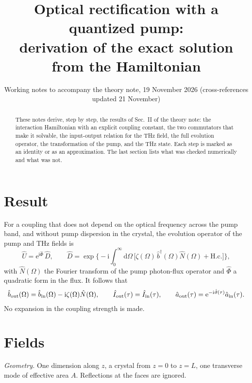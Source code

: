 \documentclass[aps,pra,onecolumn,notitlepage,11pt,amsmath,amssymb,nofootinbib]{revtex4-2}
\newcommand{\Nop}{\hat N}
\newcommand{\Iop}{\hat I}
\newcommand{\dd}{\mathrm{d}}
\newcommand{\ee}{\mathrm{e}}
\newcommand{\ii}{\mathrm{i}}
\begin{document}
\title{Optical rectification with a quantized pump:\\
derivation of the exact solution from the Hamiltonian}
\author{Working notes to accompany the theory note, 19 November 2026
(cross-references updated 21 November)}
\noaffiliation

\begin{abstract}
These notes derive, step by step, the results of Sec.~II of the theory note:
the interaction Hamiltonian with an explicit coupling constant, the two
commutators that make it solvable, the input-output relation for the THz
field, the full evolution operator, the transformation of the pump, and the
THz state. Each step is marked as an identity or as an approximation. The
last section lists what was checked numerically and what was not.
\end{abstract}

\maketitle

\section{Result}

For a coupling that does not depend on the optical frequency across the pump
band, and without pump dispersion in the crystal, the evolution operator of
the pump and THz fields is
\begin{equation}
\hat U=\ee^{\ii\hat\Phi}\,\hat D,\qquad
\hat D=\exp\!\Big\{-\ii\!\int_0^\infty\!\!\dd\Omega\,
\big[\zeta(\Omega)\,\hat b^\dagger(\Omega)\Nop(\Omega)+\mathrm{H.c.}\big]\Big\},
\label{eq:result}
\end{equation}
with $\Nop(\Omega)$ the Fourier transform of the pump photon-flux operator and
$\hat\Phi$ a quadratic form in the flux. It follows that
\begin{equation}
\hat b_{\rm out}(\Omega)=\hat b_{\rm in}(\Omega)-\ii\zeta(\Omega)\Nop(\Omega),
\qquad \Iop_{\rm out}(\tau)=\Iop_{\rm in}(\tau),
\qquad \hat a_{\rm out}(\tau)=\ee^{-\ii\hat\vartheta(\tau)}\hat a_{\rm in}(\tau).
\label{eq:io}
\end{equation}
No expansion in the coupling strength is made.

\section{Fields}

\emph{Geometry.} One dimension along $z$, a crystal from $z=0$ to $z=L$, one
transverse mode of effective area $A$. Reflections at the faces are ignored.
\end{document}
